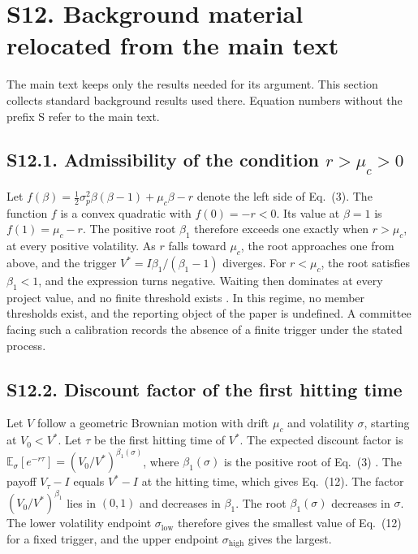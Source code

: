 \documentclass[11pt]{article}
\newcommand{\slow}{\sigma_{\mathrm{low}}}
\newcommand{\shigh}{\sigma_{\mathrm{high}}}
\begin{document}
\section*{S12. Background material relocated from the main text}

The main text keeps only the results needed for its argument. This section collects standard background results used there. Equation numbers without the prefix S refer to the main text.

\subsection*{S12.1. Admissibility of the condition $r>\mu_c>0$}

Let $f(\beta)=\tfrac{1}{2}\sigma_p^{2}\beta(\beta-1)+\mu_c\beta-r$ denote the left side of Eq.~(3). The function $f$ is a convex quadratic with $f(0)=-r<0$. Its value at $\beta=1$ is $f(1)=\mu_c-r$. The positive root $\beta_1$ therefore exceeds one exactly when $r>\mu_c$, at every positive volatility. As $r$ falls toward $\mu_c$, the root approaches one from above, and the trigger $V^{*}=I\beta_1/(\beta_1-1)$ diverges. For $r<\mu_c$, the root satisfies $\beta_1<1$, and the expression turns negative. Waiting then dominates at every project value, and no finite threshold exists \citep{DixitPindyck1994}. In this regime, no member thresholds exist, and the reporting object of the paper is undefined. A committee facing such a calibration records the absence of a finite trigger under the stated process.

\subsection*{S12.2. Discount factor of the first hitting time}

Let $V$ follow a geometric Brownian motion with drift $\mu_c$ and volatility $\sigma$, starting at $V_0<V^{*}$. Let $\tau$ be the first hitting time of $V^{*}$. The expected discount factor is $\mathbb{E}_{\sigma}[e^{-r\tau}]=(V_0/V^{*})^{\beta_1(\sigma)}$, where $\beta_1(\sigma)$ is the positive root of Eq.~(3) \citep{DixitPindyck1994}. The payoff $V_{\tau}-I$ equals $V^{*}-I$ at the hitting time, which gives Eq.~(12). The factor $(V_0/V^{*})^{\beta_1}$ lies in $(0,1)$ and decreases in $\beta_1$. The root $\beta_1(\sigma)$ decreases in $\sigma$. The lower volatility endpoint $\slow$ therefore gives the smallest value of Eq.~(12) for a fixed trigger, and the upper endpoint $\shigh$ gives the largest.
\end{document}
